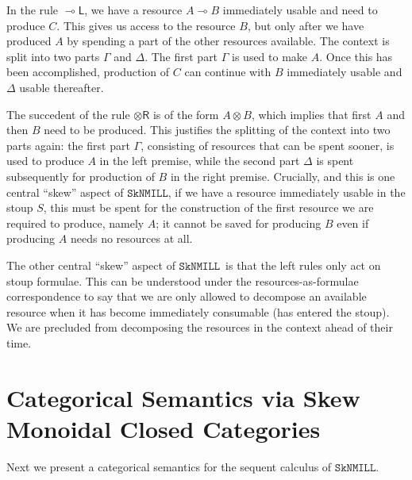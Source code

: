 \documentclass[copyright,creativecommons]{eptcs}
\theoremstyle{definition}
\newcommand{\tr}{\otimes \mathsf{R}}
\newcommand{\lleft}{{\multimap}\mathsf{L}}
\newcommand{\ot}{\otimes}
\newcommand{\lolli}{\multimap}
\newcommand{\SkNMILL}{$\mathtt{SkNMILL}$}
\begin{document}
In the rule $\lleft$, we have a resource $A
\lolli B$ immediately usable and need to produce $C$. This gives us
access to the resource $B$, but only after we have produced $A$ by spending a part of the other resources available.  The context is split into two parts $\Gamma$ and $\Delta$. The first part $\Gamma$ is used to make $A$. Once this has been accomplished, production of $C$ can continue with $B$ immediately usable and $\Delta$ usable thereafter.

The succedent of the rule $\tr$ is of the form $A \ot B$, which
implies that first $A$ and then $B$ need to be produced. This justifies the
splitting of the context into two parts again: the first part $\Gamma$, consisting of
resources that can be spent sooner, is used to produce $A$ in the left
premise, while the second part $\Delta$ is spent subsequently for production of $B$ in the
right premise. Crucially, and this is one central ``skew'' aspect
of \SkNMILL, if we have a resource immediately usable in the
stoup $S$, this must be spent for the construction of the first resource
we are required to produce, namely $A$; it cannot be saved for producing $B$ even if producing $A$ needs no resources at all.

The other central ``skew'' aspect of \SkNMILL\ is that the left
rules only act on stoup formulae. This can be understood under the
resources-as-formulae correspondence to say that we are only allowed to
decompose an available resource when it has become immediately consumable (has entered the stoup). We are precluded from decomposing the
resources in the context ahead of their time.



\section{Categorical Semantics via Skew Monoidal Closed Categories}
\label{sec:catsem}

Next we present a categorical semantics for the sequent calculus of \SkNMILL.
\end{document}
